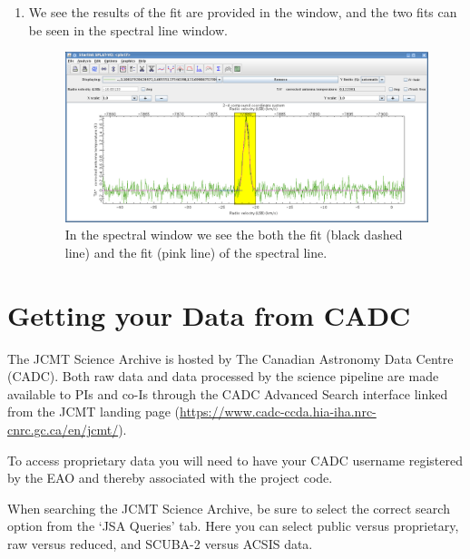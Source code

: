 \documentclass[11pt,oneside,chapters]{starlink}
\begin{document}
\begin{enumerate}[label=(\textbf{\arabic*})]
\item We see the results of the fit are provided in the
 window, and the two fits can
be seen in the spectral line window.

\begin{figure}[h!]
\begin{center}
\includegraphics[width=0.9\linewidth]{sc20_splat_fit5}
\caption[Spectrum with fits.]{\label{fig:splat_stats5}
  In the spectral window we see the both the 
  fit (black dashed line) and the  fit
  (pink line) of the spectral line.}
\end{center}
\end{figure}





\end{enumerate}



\clearpage
\chapter{Getting your Data from CADC}
\label{sec:fromcadc}

The JCMT Science Archive is hosted by The Canadian Astronomy Data
Centre (CADC). Both raw data and data processed by the science pipeline
are made available to PIs and co-Is through the CADC Advanced Search
interface linked from the JCMT landing page
(\url{https://www.cadc-ccda.hia-iha.nrc-cnrc.gc.ca/en/jcmt/}).

To access proprietary data you will need to have your CADC username
registered by the EAO and thereby associated with the project code.

When searching the JCMT Science Archive, be sure to select the correct
search option from the `JSA Queries' tab. Here you can select public
versus proprietary, raw versus reduced, and SCUBA-2 versus ACSIS data.
\end{document}
